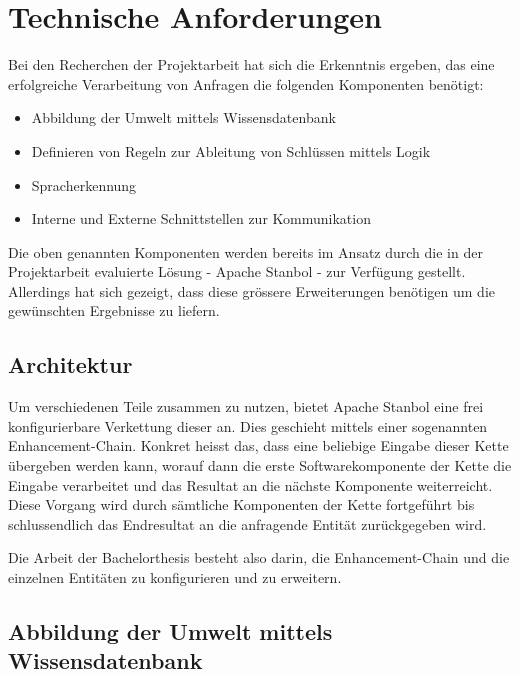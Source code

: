 ﻿\chapter{Technische Anforderungen}
\label{chap:technischeAnforderungen}

Bei den Recherchen der Projektarbeit hat sich die Erkenntnis ergeben, das eine erfolgreiche Verarbeitung von Anfragen die folgenden Komponenten benötigt:
\begin{itemize}
	\item Abbildung der Umwelt mittels Wissensdatenbank
	\item Definieren von Regeln zur Ableitung von Schlüssen mittels Logik
	\item Spracherkennung 
	\item Interne und Externe Schnittstellen zur Kommunikation
\end{itemize}

Die oben genannten Komponenten werden bereits im Ansatz durch die in der Projektarbeit evaluierte Lösung - Apache Stanbol - zur Verfügung gestellt. Allerdings hat sich gezeigt, dass diese grössere Erweiterungen benötigen um die gewünschten Ergebnisse zu liefern.

\section{Architektur}
\label{sec:architektur}
Um verschiedenen Teile zusammen zu nutzen, bietet Apache Stanbol eine frei konfigurierbare Verkettung dieser an. Dies geschieht mittels einer sogenannten Enhancement-Chain. Konkret heisst das, dass eine beliebige Eingabe dieser Kette übergeben werden kann, worauf dann die erste Softwarekomponente der Kette die Eingabe verarbeitet und das Resultat an die nächste Komponente weiterreicht. Diese Vorgang wird durch sämtliche Komponenten der Kette fortgeführt bis schlussendlich das Endresultat an die  anfragende Entität zurückgegeben wird.

Die Arbeit der Bachelorthesis besteht also darin, die Enhancement-Chain und die einzelnen Entitäten zu konfigurieren und zu erweitern.


\section{Abbildung der Umwelt mittels Wissensdatenbank}
\label{sec:architektur_wissensdatenbank}
